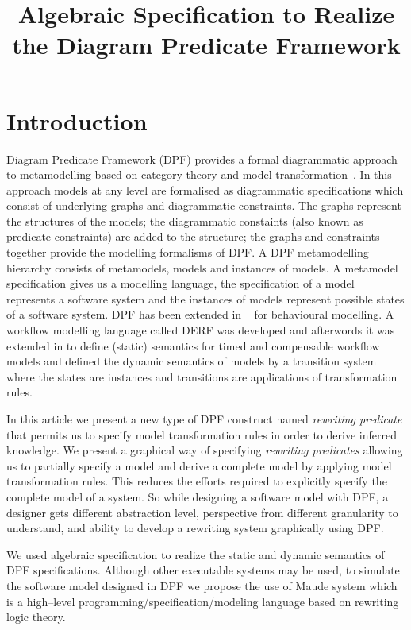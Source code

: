 \documentclass{eceasst}
\title{Algebraic Specification to Realize the Diagram Predicate Framework} %
\begin{document}
\maketitle

\section{Introduction}
Diagram Predicate Framework (DPF) provides a formal diagrammatic approach to metamodelling based on category theory and model transformation~\cite{Rutle10}. 
In this approach models at any level are formalised as diagrammatic specifications which consist of underlying graphs and diagrammatic constraints. 
The graphs represent the structures of the models; the diagrammatic constaints (also known as predicate constraints) are added to the structure; 
the graphs and constraints together provide the modelling formalisms of DPF. 
A DPF metamodelling hierarchy consists of metamodels, models and instances of models. 
A metamodel specification gives us a modelling language, the specification of a model represents a software system and the instances of models represent possible states of a software system. 
DPF has been extended in ~\cite{RutleMacCaullEtAl2012ECMFA,RutleWMFHIES12} for behavioural modelling. 
A workflow modelling language called DERF was developed and afterwords it was extended in \cite{WangRutleEtAl2012TASE} to define (static) semantics for timed and compensable workflow models and 
defined the dynamic semantics of models by a transition system where the states are instances and transitions are applications of transformation rules. 


In this article we present a new type of DPF construct named \textit{rewriting predicate} that permits us to specify model transformation rules in order to derive inferred knowledge. 
We present a graphical way of specifying \textit{rewriting predicates} allowing us to partially specify a model and derive a complete model by applying model transformation rules. 
This reduces the efforts required to explicitly specify the complete model of a system. 
So while designing a software model with DPF, a designer gets different abstraction level, perspective from different granularity to understand, 
and ability to develop a rewriting system graphically using DPF. 

We used algebraic specification to realize the static and dynamic semantics of DPF specifications. 
Although other executable systems may be used, to simulate the software model designed in DPF we propose the use of Maude system \cite{Bruni2006,Clavel2007} 
which is a high--level programming/specification/modeling language based on rewriting logic theory. 
\end{document}

